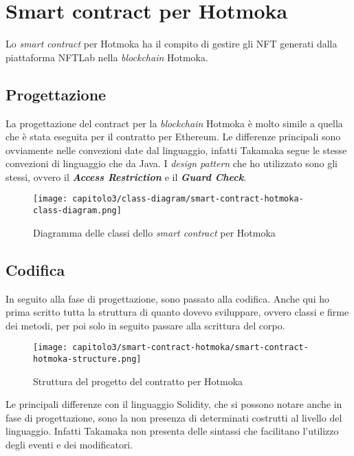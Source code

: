 
\section{Smart contract per Hotmoka}
Lo \textit{smart contract} per Hotmoka ha il compito di gestire gli NFT generati dalla piattaforma NFTLab nella \textit{blockchain} Hotmoka.

\subsection{Progettazione}
La progettazione del contract per la \textit{blockchain} Hotmoka è molto simile a quella che è stata eseguita per il contratto per Ethereum. Le differenze principali sono ovviamente nelle convezioni date dal linguaggio, infatti Takamaka segue le stesse convezioni di linguaggio che da Java. 
I \textit{design pattern} che ho utilizzato sono gli stessi, ovvero il \textbf{\textit{Access Restriction}} e il \textbf{\textit{Guard Check}}.

\begin{figure}[h!]
  \centering
  \texttt{[image: capitolo3/class-diagram/smart-contract-hotmoka-class-diagram.png]}
  \caption{Diagramma delle classi dello \textit{smart contract} per Hotmoka}
\end{figure}

\subsection{Codifica}
In seguito alla fase di progettazione, sono passato alla codifica. Anche qui ho prima scritto tutta la struttura di quanto dovevo sviluppare, ovvero classi e firme dei metodi, per poi solo in seguito passare alla scrittura del corpo.

\clearpage
\begin{figure}[h!]
  \centering
  \texttt{[image: capitolo3/smart-contract-hotmoka/smart-contract-hotmoka-structure.png]}
  \caption{Struttura del progetto del contratto per Hotmoka}
\end{figure}

Le principali differenze con il linguaggio Solidity, che si possono notare anche in fase di progettazione, sono la non presenza di determinati costrutti al livello del linguaggio. Infatti Takamaka non presenta delle sintassi che facilitano l'utilizzo degli eventi e dei modificatori.


